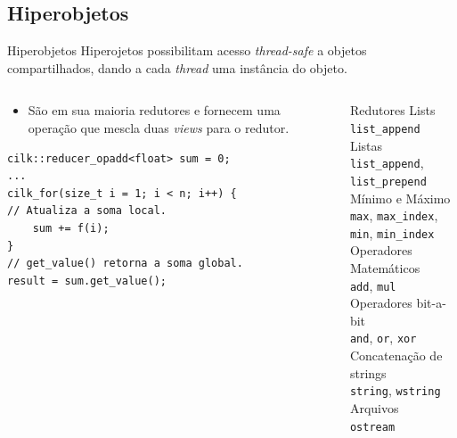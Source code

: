 \documentclass{beamer}
\begin{document}
\subsection{Hiperobjetos}
\begin{frame}[fragile]{Hiperobjetos}
    Hiperojetos possibilitam acesso \textit{thread-safe} a objetos compartilhados, dando a cada \textit{thread} uma instância do objeto.
\begin{columns}[T]
\begin{column}{0.5\textwidth}
\begin{itemize}
    \item São em sua maioria redutores e fornecem uma operação que mescla duas \textit{views} para o redutor. 
\end{itemize}
\begin{footnotesize}
\begin{block}{}
\begin{lstlisting}
cilk::reducer_opadd<float> sum = 0;
...
cilk_for(size_t i = 1; i < n; i++) {
// Atualiza a soma local.
    sum += f(i);
}
// get_value() retorna a soma global.
result = sum.get_value(); 
\end{lstlisting}
\end{block}
\end{footnotesize}

\end{column}

\begin{column}{0.4\textwidth}
\begin{footnotesize}
\begin{block}{Redutores}
Lists \\
\qquad \texttt{list\_append} \\
Listas \\
\qquad \texttt{list\_append}, \texttt{list\_prepend} \\
Mínimo e Máximo \\
\qquad \texttt{max}, \texttt{max\_index}, \texttt{min}, \texttt{min\_index} \\
Operadores Matemáticos \\
\qquad \texttt{add}, \texttt{mul} \\
Operadores bit-a-bit \\
\qquad \texttt{and}, \texttt{or}, \texttt{xor} \\
Concatenação de strings \\
\qquad \texttt{string}, \texttt{wstring} \\
Arquivos \\
\qquad \texttt{ostream}
\end{block}
\end{footnotesize}

\end{column}

\end{columns}
\end{frame}
\end{document}
